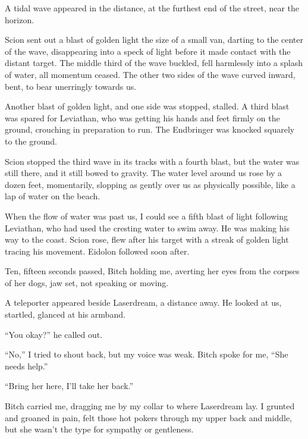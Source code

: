 A tidal wave appeared in the distance, at the furthest end of the street, near the horizon.



Scion sent out a blast of golden light the size of a small van, darting to the center of the wave, disappearing into a speck of light before it made contact with the distant target.  The middle third of the wave buckled, fell harmlessly into a splash of water, all momentum ceased.  The other two sides of the wave curved inward, bent, to bear unerringly towards us.



Another blast of golden light, and one side was stopped, stalled.  A third blast was spared for Leviathan, who was getting his hands and feet firmly on the ground, crouching in preparation to run.  The Endbringer was knocked squarely to the ground.



Scion stopped the third wave in its tracks with a fourth blast, but the water was still there, and it still bowed to gravity.  The water level around us rose by a dozen feet, momentarily, slopping as gently over us as physically possible, like a lap of water on the beach.



When the flow of water was past us, I could see a fifth blast of light following Leviathan, who had used the cresting water to swim away.  He was making his way to the coast.  Scion rose, flew after his target with a streak of golden light tracing his movement.  Eidolon followed soon after.



Ten, fifteen seconds passed, Bitch holding me, averting her eyes from the corpses of her dogs, jaw set, not speaking or moving.



A teleporter appeared beside Laserdream, a distance away.  He looked at us, startled, glanced at his armband.



``You okay?'' he called out.



``No,'' I tried to shout back, but my voice was weak.  Bitch spoke for me, ``She needs help.''



``Bring her here, I'll take her back.''



Bitch carried me, dragging me by my collar to where Laserdream lay.  I grunted and groaned in pain, felt those hot pokers through my upper back and middle, but she wasn't the type for sympathy or gentleness.



